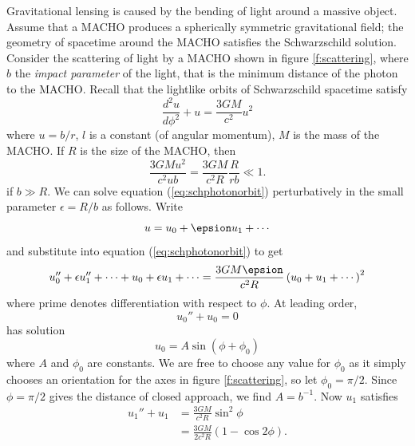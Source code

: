 Gravitational lensing is caused by the bending of light around a massive
object. Assume that a MACHO produces a spherically symmetric gravitational
field; the geometry of spacetime around the MACHO satisfies the Schwarzschild
solution. Consider the scattering of light by a MACHO shown in figure
\ref{f:scattering}, where $b$ the \emph{impact parameter} of the light, that
is the minimum distance of the photon to the MACHO.   Recall that the
lightlike orbits of Schwarzschild spacetime satisfy\cite{Wald:1984}
\begin{equation}
\frac{d^2 u}{d\phi^2} + u = \frac{3GM}{c^2}u^2
\label{eq:schphotonorbit}
\end{equation}
where $u = b/r$, $l$ is a constant (of angular momentum), $M$ is the mass
of the MACHO. If $R$ is the size of the
MACHO, then
\begin{equation}
\frac{3GMu^2}{c^2ub} = \frac{3GM}{c^2R} \frac{R}{rb} \ll 1.
\end{equation}
if $b \gg R$. We can solve equation (\ref{eq:schphotonorbit}) perturbatively
in the small parameter $\epsilon = R / b$ as follows. Write
\begin{equation}
u = u_0 + \epsion u_1 + \cdots
\end{equation}
and substitute into equation (\ref{eq:schphotonorbit}) to get
\begin{equation}
u_0'' + \epsilon u_1'' + \cdots + u_0 + \epsilon u_1 + \cdots = \frac{3GM\epsion}{c^2R}\left(u_0 + u_1 +
\cdots\right)^2 
\end{equation}
where prime denotes differentiation with respect to $\phi$. At leading order,
\begin{equation}
u_0'' + u_0 = 0
\end{equation}
has solution
\begin{equation}
u_0 = A \sin \left(\phi + \phi_0\right)
\end{equation}
where $A$ and $\phi_0$ are constants. We are free to choose any value for
$\phi_0$ as it simply chooses an orientation for the axes in figure
\ref{f:scattering}, so let $\phi_0 = \pi /2$. Since $\phi = \pi / 2$
gives the distance of closed approach, we find $A = b^{-1}$. Now $u_1$
satisfies
\begin{equation}
\begin{split}
u_1'' + u_1 &= \frac{3GM}{c^2 R} \sin^2 \phi \\
&= \frac{3GM}{2c^2 R}\left(1 - \cos 2\phi\right).
\label{eq:u1eq}
\end{split}
\end{equation}
